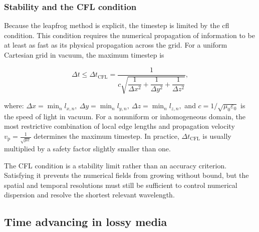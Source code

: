 \subsubsection{Stability and the CFL condition}
\label{sec:fit_cfl}

Because the leapfrog method is explicit, the timestep is limited by the
\gls{cfl} condition. This condition requires the numerical propagation of
information to be at least as fast as its physical propagation across the grid. For a uniform Cartesian grid in vacuum, the maximum timestep is

\begin{equation}
\Delta t
\leq
\Delta t_{\mathrm{CFL}}
=
\frac{1}
{c\sqrt{
\dfrac{1}{\Delta x^2}
+\dfrac{1}{\Delta y^2} +\dfrac{1}{\Delta z^2}}},
\label{eq:fit_cartesian_cfl}
\end{equation}

where: $\Delta x=\min_n l_{x,n},\ \Delta y=\min_n l_{y,n},\ \Delta z=\min_n l_{z,n},$ and $c=1/\sqrt{\mu_0\varepsilon_0}$ is the speed of light in vacuum. For a nonuniform or inhomogeneous domain, the most restrictive combination of local edge lengths and propagation velocity $v_{\mathrm{p}}=\frac{1}{\sqrt{\mu\varepsilon}}$ determines the maximum timestep. In practice, $\Delta t_{\mathrm{CFL}}$ is usually multiplied by a safety factor slightly smaller than one.

The CFL condition is a stability limit rather than an accuracy criterion. Satisfying it prevents the numerical fields from growing without bound, but the spatial and temporal resolutions must still be sufficient to control numerical dispersion and resolve the shortest relevant wavelength.

\subsection{Time advancing in lossy media}
\label{sec:time_advancing_losses}

